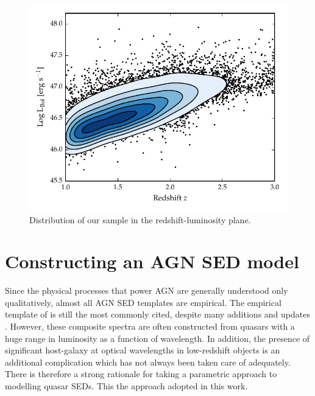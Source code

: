 \begin{figure}
  \centering
  \includegraphics[width=\textwidth]{figures/chapter05/lum_z.pdf}
  \caption[{Distribution of our sample in the redshift-luminosity plane.}]{Distribution of our sample in the redshift-luminosity plane.}
  \label{fig:lum_z}
\end{figure}

\section{Constructing an AGN SED model}

Since the physical processes that power AGN are generally understood only qualitatively, almost all AGN SED templates are empirical. 
The empirical template of \citet{elvis94} is still the most commonly cited, despite many additions and updates \citep[e.g.][]{polletta00, kuraszkiewicz03, risaliti04, richards06,  polletta07, lusso10, shang11, marchese12, trichas12}. 
However, these composite spectra are often constructed from quasars with a huge range in luminosity as a function of wavelength. 
In addition, the presence of significant host-galaxy at optical wavelengths in low-redshift objects is an additional complication which has not always been taken care of adequately.
There is therefore a strong rationale for taking a parametric approach to modelling quasar SEDs. 
This the approach adopted in this work. 

